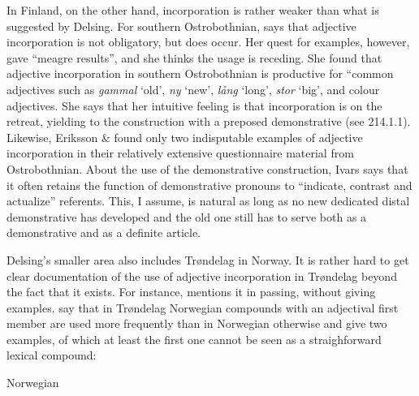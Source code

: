 \begin{styleBodytextC}
In Finland, on the other hand, incorporation is rather weaker than what is suggested by Delsing. For southern Ostrobothnian, \citet{Ivars2005} says that adjective incorporation is not obligatory, but does occur. Her quest for examples, however, gave “meagre results”, and she thinks the usage is receding. She found that adjective incorporation in southern Ostrobothnian is productive for “common adjectives such as \textit{gammal} ‘old’, \textit{ny} ‘new’, \textit{lång} ‘long’, \textit{stor} ‘big’, and colour adjectives. She says that her intuitive feeling is that incorporation is on the retreat, yielding to the construction with a preposed demonstrative (see 214.1.1).  Likewise, Eriksson \& \citet{Rendahl1999} found only two indisputable examples of adjective incorporation in their relatively extensive questionnaire material from Ostrobothnian. About the use of the demonstrative construction, Ivars says that it often retains the function of demonstrative pronouns to “indicate, contrast and actualize” referents. This, I assume, is natural as long as no new dedicated distal demonstrative has developed and the old one still has to serve both as a demonstrative and as a definite article. 

\end{styleBodytextC}

\begin{styleBodytextC}
Delsing’s smaller area also includes Trøndelag in Norway. It is rather hard to get clear documentation of the use of adjective incorporation in Trøndelag beyond the fact that it exists. For instance, \citet[161]{Vangsnes2003} mentions it in passing, without giving examples. \citet[161]{FaarlundEtAl1997} say that in Trøndelag Norwegian compounds with an adjectival first member are used more frequently than in Norwegian otherwise and give two examples, of which at least the first one cannot be seen as a straighforward lexical compound: 

\end{styleBodytextC}


\begin{listWWNumileveli}
\item {}

\begin{styleExample}
Norwegian 

\end{styleExample}

\end{listWWNumileveli}

